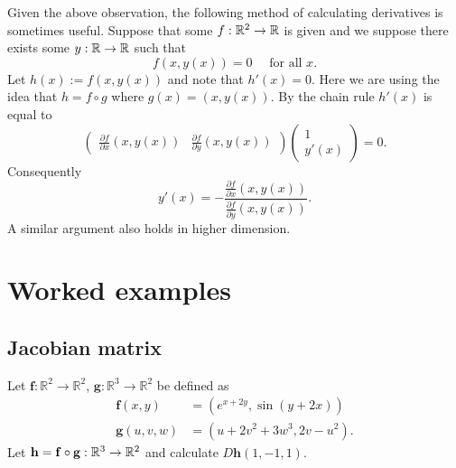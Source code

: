 Given the above observation, the following method of calculating derivatives is sometimes useful.
Suppose that some \(f:\mathbb{R}^2 \to \mathbb{R}\) is given and we suppose there exists some \(y:\mathbb{R}\to\mathbb{R}\) such that
\[
    f(x,y(x))=0 \quad \text{ for all \(x\)}.
\]
Let \(h(x):= f(x,y(x))\) and note that \(h'(x)=0\).
Here we are using the idea that \(h = f \circ g\) where \(g(x) = (x,y(x))\).
By the chain rule \( h'(x)\) is equal to
\[
    \begin{pmatrix}
        \frac{\partial f}{\partial x}(x,y(x)) & \frac{\partial f}{\partial y}(x,y(x))
    \end{pmatrix}
    \begin{pmatrix}
        1 \\
        y'(x)
    \end{pmatrix}
    =0.
\]
Consequently
\[
    y'(x) = - \frac{ \frac{\partial f}{\partial x}(x,y(x)) }{ \frac{\partial f}{\partial y}(x,y(x)) }.
\]
A similar argument also holds in higher dimension.


\section*{Worked examples}

\subsection*{Jacobian matrix}

\question
Let $\mathbf{f}:\mathbb{R}^2\to\mathbb{R}^2$, $\mathbf{g}:\mathbb{R}^3\to\mathbb{R}^2$ be defined as
\[
    \begin{aligned}
        \mathbf{f}(x,y)   & = (e^{x+2y}, \sin(y+2x)) \\
        \mathbf{g}(u,v,w) & = (u+2v^2+3w^3,2v-u^2).
    \end{aligned}
\]
Let $\mathbf{h} =\mathbf{f} \circ \mathbf{g} : \mathbb{R}^3 \to \mathbb{R}^2$ and calculate \(D\mathbf{h}(1,-1,1)\).

